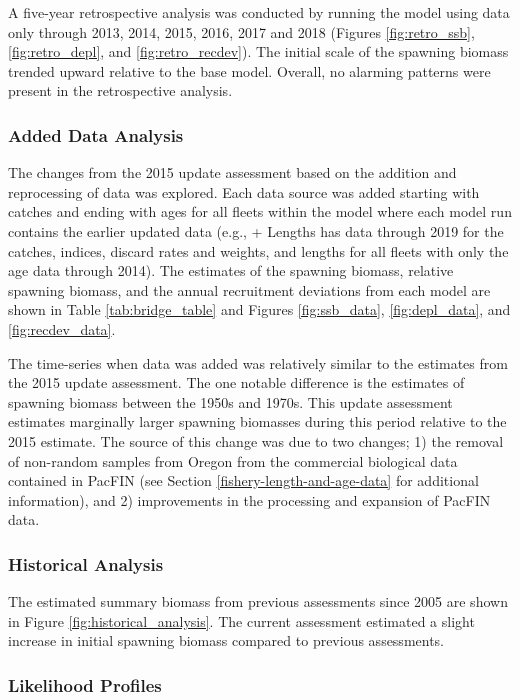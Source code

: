 \documentclass[12pt,]{article}
\begin{document}
A five-year retrospective analysis was conducted by running the model
using data only through 2013, 2014, 2015, 2016, 2017 and 2018 (Figures
\ref{fig:retro_ssb}, \ref{fig:retro_depl}, and \ref{fig:retro_recdev}).
The initial scale of the spawning biomass trended upward relative to the
base model. Overall, no alarming patterns were present in the
retrospective analysis.

\subsubsection{Added Data Analysis}\label{added-data-analysis}

The changes from the 2015 update assessment based on the addition and
reprocessing of data was explored. Each data source was added starting
with catches and ending with ages for all fleets within the model where
each model run contains the earlier updated data (e.g., + Lengths has
data through 2019 for the catches, indices, discard rates and weights,
and lengths for all fleets with only the age data through 2014). The
estimates of the spawning biomass, relative spawning biomass, and the
annual recruitment deviations from each model are shown in Table
\ref{tab:bridge_table} and Figures \ref{fig:ssb_data},
\ref{fig:depl_data}, and \ref{fig:recdev_data}.

The time-series when data was added was relatively similar to the
estimates from the 2015 update assessment. The one notable difference is
the estimates of spawning biomass between the 1950s and 1970s. This
update assessment estimates marginally larger spawning biomasses during
this period relative to the 2015 estimate. The source of this change was
due to two changes; 1) the removal of non-random samples from Oregon
from the commercial biological data contained in PacFIN (see Section
\ref{fishery-length-and-age-data} for additional information), and 2)
improvements in the processing and expansion of PacFIN data.

\subsubsection{Historical Analysis}\label{historical-analysis}

The estimated summary biomass from previous assessments since 2005 are
shown in Figure \ref{fig:historical_analysis}. The current assessment
estimated a slight increase in initial spawning biomass compared to
previous assessments.

\subsubsection{Likelihood Profiles}\label{likelihood-profiles}
\end{document}
